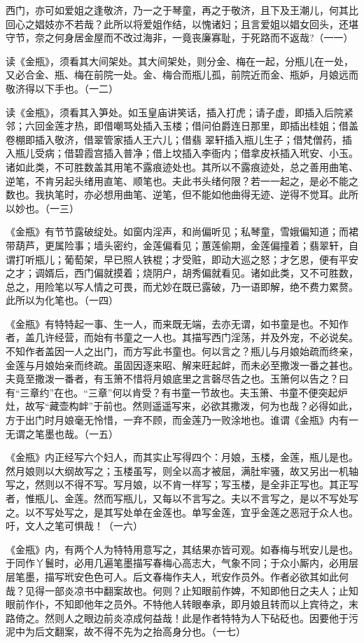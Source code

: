 {西门，亦可如爱姐之逢敬济，乃一之于琴童，再之于敬济，且下及王潮儿，何其比回心之娼妓亦不若哉？此所以将爱姐作结，以愧诸妇；且言爱姐以娼女回头，还堪守节，奈之何身居金屋而不改过海非，一竟丧廉寡耻，于死路而不返哉?（一一）

读《金瓶》，须看其大间架处。其大间架处，则分金、梅在一起，分瓶儿在一处，又必合金、瓶、梅在前院一处。金、梅合而瓶儿孤，前院近而金、瓶妒，月娘远而敬济得以下手也。（一二）

读《金瓶》，须看其入笋处。如玉皇庙讲笑话，插入打虎；请子虚，即插入后院紧邻；六回金莲才热，即借嘲骂处插入玉楼；借问伯爵连日那里，即插出桂姐；借盖卷棚即插入敬济，借翠管家插人王六儿；借翡
翠轩插入瓶儿生子；借梵僧药，插入瓶儿受病；借碧霞宫插入普净；借上坟插入李衙内；借拿皮袄插入玳安、小玉。诸如此类，不可胜数盖其用笔不露痕迹处也。其所以不露痕迹处，总之善用曲笔、逆笔，不肯另起头绪用直笔、顺笔也。夫此书头绪何限？若一一起之，是必不能之数也。我执笔时，亦必想用曲笔、逆笔，但不能如他曲得无迹、逆得不觉耳。此所以妙也。（一三）

《金瓶》有节节露破绽处。如窗内淫声，和尚偏听见；私琴童，雪娥偏知道；而裙带葫芦，更属险事；墙头密约，金莲偏看见；蕙莲偷期，金莲偏撞着；翡翠轩，自谓打听瓶儿；葡萄架，早已照人铁棍；才受赃，即动大巡之怒；才乞恩，便有平安之才；调婿后，西门偏就摸着；烧阴户，胡秀偏就看见。诸如此类，又不可胜数，总之，用险笔以写人情之可畏，而尤妙在既已露破，乃一语即解，绝不费力累赘。此所以为化笔也。（一四）

《金瓶》有特特起一事、生一人，而来既无端，去亦无谓，如书童是也。不知作者，盖几许经营，而始有书童之一人也。其描写西门淫荡，并及外宠，不必说矣。不知作者盖因一人之出门，而方写此书童也。何以言之？瓶儿与月娘始疏而终亲，金莲与月娘始亲而终疏。虽固因逐来昭、解来旺起衅，而未必至撒泼一番之甚也。夫竟至撒泼一番者，有玉箫不惜将月娘底里之言磬尽告之也。玉箫何以告之？曰有“三章约”在也。“三章”何以肯受？有书童一节故也。夫玉箫、书童不便突起炉灶，故写“藏壶构衅”于前也。然则遥遥写来，必欲其撒泼，何为也哉？必得如此，方于出门时月娘毫无怜惜，一弃不顾，而金莲乃一败涂地也。谁谓《金瓶》内有一无谓之笔墨也哉。（一五）

《金瓶》内正经写六个妇人，而其实止写得四个：月娘，玉楼，金莲，瓶儿是也。然月娘则以大纲故写之；玉楼虽写，则全以高才被屈，满肚牢骚，故又另出一机轴写之，然则以不得不写。写月娘，以不肯一样写；写玉楼，是全非正写也。其正写者，惟瓶儿、金莲。然而写瓶儿，又每以不言写之。夫以不言写之，是以不写处写之。以不写处写之，是其写处单在金莲也。单写金莲，宜乎金莲之恶冠于众人也。吁，文人之笔可惧哉！（一六）

《金瓶》内，有两个人为特特用意写之，其结果亦皆可观。如春梅与玳安儿是也。于同作丫鬟时，必用几遍笔墨描写春梅心高志大，气象不同；于众小厮内，必用层层笔墨，描写玳安色色可人。后文春梅作夫人，玳安作员外。作者必欲其如此何哉？见得一部炎凉书中翻案故也。何则？止知眼前作婢，不知即他日之夫人；止知眼前作仆，不知即他年之员外。不特他人转眼奉承，即月娘且转而以上宾待之，末路倚之。然则人之眼边前炎凉成何益哉！此是作者特特为人下砧砭也。因要他于污泥中为后文翻案，故不得不先为之抬高身分也。（一七）

}
